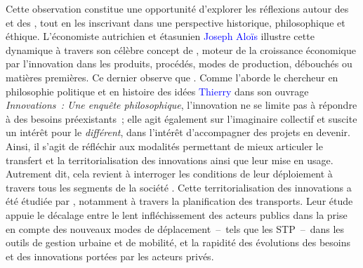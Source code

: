 \begin{refsegment}
Cette observation constitue une opportunité d’explorer les réflexions autour des  et des  \textcolor{blue}{\autocite[]{schumpeter_theorie_1911}}, tout en les inscrivant dans une perspective historique, philosophique et éthique. L’économiste autrichien et étasunien \textcolor{blue}{Joseph Aloïs} \textcolor{blue}{\textcite[107]{schumpeter_capitalisme_1942}} illustre cette dynamique à travers son célèbre concept de , moteur de la croissance économique par l’innovation dans les produits, procédés, modes de production, débouchés ou matières premières. Ce dernier observe que . Comme l'aborde le chercheur en philosophie politique et en histoire des idées \textcolor{blue}{Thierry} \textcolor{blue}{\textcite{menissier_innovations_2021}} dans son ouvrage \textsl{Innovations~: Une enquête philosophique}, l’innovation ne se limite pas à répondre à des besoins préexistants~; elle agit également sur l’imaginaire collectif et suscite un intérêt pour le \textsl{différent}, dans l'intérêt d'accompagner des projets en devenir. Ainsi, il s’agit de réfléchir aux modalités permettant de mieux articuler le transfert et la territorialisation des innovations ainsi que leur mise en usage. Autrement dit, cela revient à interroger les conditions de leur déploiement à travers tous les segments de la société \textcolor{blue}{\autocite[5]{baron_thierry_2022}}. Cette territorialisation des innovations a été étudiée par \textcolor{blue}{\textcite[13]{castex_prise_2017}}, notamment à travers la planification des transports. Leur étude appuie le décalage entre le lent infléchissement des acteurs publics dans la prise en compte des nouveaux modes de déplacement~–~tels que les \acrfull{STP}~–~dans les outils de gestion urbaine et de mobilité, et la rapidité des évolutions des besoins et des innovations portées par les acteurs privés.%


\end{refsegment}
